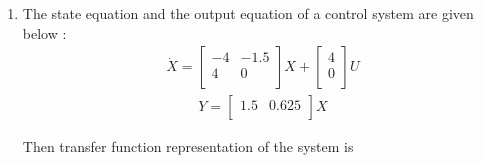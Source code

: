 \begin{enumerate}[label=\thesection.\arabic*.,ref=\thesection.\theenumi]

\item
The state equation and the output equation of a control system are given below : 
\begin{align}
    \dot{X} =
  \left[ {\begin{array}{cc}
   -4 & -1.5 \\
   4 & 0 \\
  \end{array} }\right] X +
  \left[ {\begin{array}{cc}
      4 \\
      0 \\
  \end{array} }\right] U
\end{align}
\begin{align}
    Y = 
 \left[ {\begin{array}{cc}
   1.5 & 0.625 \\
  \end{array} }\right] X
\end{align}
  
Then transfer function representation of the system is 
\\


\end{enumerate}
